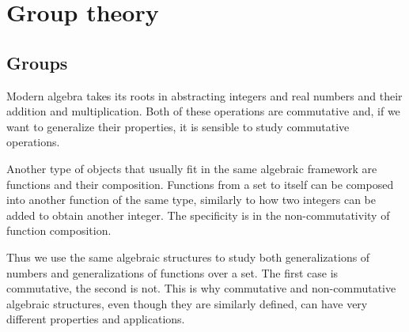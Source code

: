\section{Group theory}\label{sec:group_theory}
\subsection{Groups}\label{subsec:groups}

\begin{remark}\label{remark:numbers_vs_endomorphisms_generalizations}
  Modern algebra takes its roots in abstracting integers and real numbers  and their addition and multiplication. Both of these operations are commutative and, if we want to generalize their properties, it is sensible to study commutative operations.

  Another type of objects that usually fit in the same algebraic framework are functions and their composition. Functions from a set to itself can be composed into another function of the same type, similarly to how two integers can be added to obtain another integer. The specificity is in the non-commutativity of function composition.

  Thus we use the same algebraic structures to study both generalizations of numbers and generalizations of functions over a set. The first case is commutative, the second is not. This is why commutative and non-commutative algebraic structures, even though they are similarly defined, can have very different properties and applications.
\end{remark}

